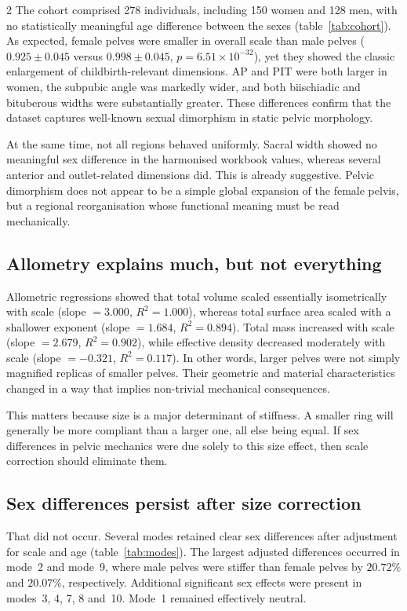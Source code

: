 \documentclass[openacc]{rsproca_new}
\begin{document}
\begin{multicols}{2}
The cohort comprised 278 individuals, including 150 women and 128 men, with no statistically meaningful age difference between the sexes (table~\ref{tab:cohort}). As expected, female pelves were smaller in overall scale than male pelves ($0.925 \pm 0.045$ versus $0.998 \pm 0.045$, $p=6.51 \times 10^{-32}$), yet they showed the classic enlargement of childbirth-relevant dimensions. AP and PIT were both larger in women, the subpubic angle was markedly wider, and both biischiadic and bituberous widths were substantially greater. These differences confirm that the dataset captures well-known sexual dimorphism in static pelvic morphology.

At the same time, not all regions behaved uniformly. Sacral width showed no meaningful sex difference in the harmonised workbook values, whereas several anterior and outlet-related dimensions did. This is already suggestive. Pelvic dimorphism does not appear to be a simple global expansion of the female pelvis, but a regional reorganisation whose functional meaning must be read mechanically.

\subsection{Allometry explains much, but not everything}

Allometric regressions showed that total volume scaled essentially isometrically with scale (slope $=3.000$, $R^2=1.000$), whereas total surface area scaled with a shallower exponent (slope $=1.684$, $R^2=0.894$). Total mass increased with scale (slope $=2.679$, $R^2=0.902$), while effective density decreased moderately with scale (slope $=-0.321$, $R^2=0.117$). In other words, larger pelves were not simply magnified replicas of smaller pelves. Their geometric and material characteristics changed in a way that implies non-trivial mechanical consequences.

This matters because size is a major determinant of stiffness. A smaller ring will generally be more compliant than a larger one, all else being equal. If sex differences in pelvic mechanics were due solely to this size effect, then scale correction should eliminate them.

\subsection{Sex differences persist after size correction}

That did not occur. Several modes retained clear sex differences after adjustment for scale and age (table~\ref{tab:modes}). The largest adjusted differences occurred in mode~2 and mode~9, where male pelves were stiffer than female pelves by $20.72\%$ and $20.07\%$, respectively. Additional significant sex effects were present in modes~3, 4, 7, 8 and~10. Mode~1 remained effectively neutral.


\end{multicols}
\end{document}
